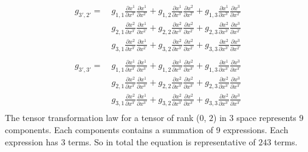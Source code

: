 \documentclass[a4paper]{article}
\begin{document}
  \[
    \begin{align*}
    g_{3', 2'} =
     &\ g_{1,1}\frac{\partial x^1}{\partial x^{3'}}\frac{\partial x^1}{\partial x^{2'}}
    +g_{1,2}\frac{\partial x^1}{\partial x^{3'}}\frac{\partial x^2}{\partial x^{2'}}
    +g_{1,3}\frac{\partial x^1}{\partial x^{3'}}\frac{\partial x^3}{\partial x^{2'}}\\
    &\
     g_{2,1}\frac{\partial x^2}{\partial x^{3'}}\frac{\partial x^1}{\partial x^{2'}}
    +g_{2,2}\frac{\partial x^2}{\partial x^{3'}}\frac{\partial x^2}{\partial x^{2'}}
    +g_{2,3}\frac{\partial x^2}{\partial x^{3'}}\frac{\partial x^3}{\partial x^{2'}}\\
    &\
     g_{3,1}\frac{\partial x^2}{\partial x^{3'}}\frac{\partial x^1}{\partial x^{2'}}
    +g_{3,2}\frac{\partial x^2}{\partial x^{3'}}\frac{\partial x^2}{\partial x^{2'}}
    +g_{3,3}\frac{\partial x^2}{\partial x^{3'}}\frac{\partial x^3}{\partial x^{2'}}\\
    \end{align*}
  \]
  \[
    \begin{align*}
    g_{3', 3'} =
     &\ g_{1,1}\frac{\partial x^1}{\partial x^{3'}}\frac{\partial x^1}{\partial x^{3'}}
    +g_{1,2}\frac{\partial x^1}{\partial x^{3'}}\frac{\partial x^2}{\partial x^{3'}}
    +g_{1,3}\frac{\partial x^1}{\partial x^{3'}}\frac{\partial x^3}{\partial x^{3'}}\\
    &\
     g_{2,1}\frac{\partial x^2}{\partial x^{3'}}\frac{\partial x^1}{\partial x^{3'}}
    +g_{2,2}\frac{\partial x^2}{\partial x^{3'}}\frac{\partial x^2}{\partial x^{3'}}
    +g_{2,3}\frac{\partial x^2}{\partial x^{3'}}\frac{\partial x^3}{\partial x^{3'}}\\
    &\
     g_{3,1}\frac{\partial x^2}{\partial x^{3'}}\frac{\partial x^1}{\partial x^{3'}}
    +g_{3,2}\frac{\partial x^2}{\partial x^{3'}}\frac{\partial x^2}{\partial x^{3'}}
    +g_{3,3}\frac{\partial x^2}{\partial x^{3'}}\frac{\partial x^3}{\partial x^{3'}}\\
    \end{align*}
  \]
The tensor transformation law for a tensor of rank ($0$, $2$) in 3 space
represents 9 components. Each components contains a summation of 9 expressions.
Each expression has 3 terms. So in total the equation is representative of
$243$ terms.
\end{document}
